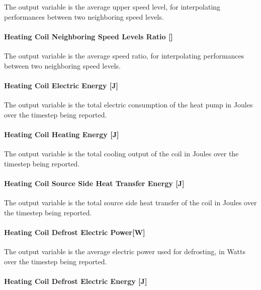 The output variable is the average upper speed level, for interpolating performances between two neighboring speed levels.

\paragraph{Heating Coil Neighboring Speed Levels Ratio {[]}}\label{heating-coil-neighboring-speed-levels-ratio}

The output variable is the average speed ratio, for interpolating performances between two neighboring speed levels.

\paragraph{Heating Coil Electric Energy {[}J{]}}\label{heating-coil-electric-energy-j-4}

The output variable is the total electric consumption of the heat pump in Joules over the timestep being reported.

\paragraph{Heating Coil Heating Energy {[}J{]}}\label{heating-coil-heating-energy-j-2}

The output variable is the total cooling output of the coil in Joules over the timestep being reported.

\paragraph{Heating Coil Source Side Heat Transfer Energy {[}J{]}}\label{heating-coil-source-side-heat-transfer-energy-j-1}

The output variable is the total source side heat transfer of the coil in Joules over the timestep being reported.

\paragraph{Heating Coil Defrost Electric Power{[}W{]}}\label{heating-coil-defrost-electric-powerw}

The output variable is the average electric power used for defrosting, in Watts over the timestep being reported.

\paragraph{Heating Coil Defrost Electric Energy {[}J{]}}\label{heating-coil-defrost-electric-energy-j-2}

